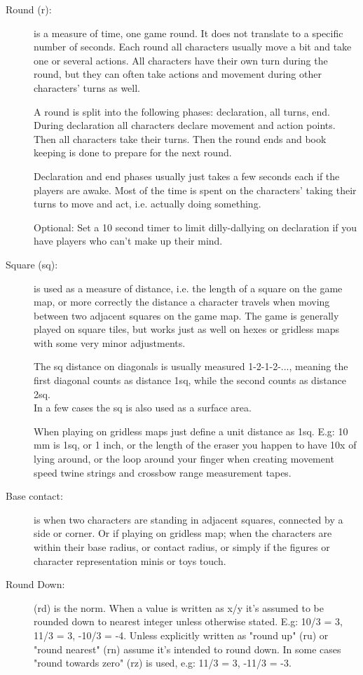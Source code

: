 \begin{description}
\item[Round (r):] is a measure of time, one game round. It does not translate to a specific number of seconds. Each round all characters usually move a bit and take one or several actions. All characters have their own turn during the round, but they can often take actions and movement during other characters' turns as well.

A round is split into the following phases: declaration, all turns, end.
During declaration all characters declare movement and action points. Then all characters take their turns. Then the round ends and book keeping is done to prepare for the next round.

Declaration and end phases usually just takes a few seconds each if the players are awake. Most of the time is spent on the characters' taking their turns to move and act, i.e. actually doing something.

Optional: Set a 10 second timer to limit dilly-dallying on declaration if you have players who can't make up their mind.


\item[Square (sq):] is used as a measure of distance, i.e. the length of a square on the game map, or more correctly the distance a character travels when moving between two adjacent squares on the game map. The game is generally played on square tiles, but works just as well on hexes or gridless maps with some very minor adjustments.

The sq distance on diagonals is usually measured 1-2-1-2-..., meaning the first diagonal counts as distance 1sq, while the second counts as distance 2sq.\\
In a few cases the sq is also used as a surface area.

When playing on gridless maps just define a unit distance as 1sq. E.g: 10 mm is 1sq, or 1 inch, or the length of the eraser you happen to have 10x of lying around, or the loop around your finger when creating movement speed twine strings and crossbow range measurement tapes.


\item[Base contact:] is when two characters are standing in adjacent squares, connected by a side or corner. Or if playing on gridless map; when the characters are within their base radius, or contact radius, or simply if the figures or character representation minis or toys touch.


\item[Round Down:] (rd) is the norm. When a value is written as x/y it's assumed to be rounded down to nearest integer unless otherwise stated. E.g: 10/3 = 3, 11/3 = 3, -10/3 = -4.
Unless explicitly written as "round up" (ru) or "round nearest" (rn) assume it's intended to round down. In some cases "round towards zero" (rz) is used, e.g: 11/3 = 3, -11/3 = -3.


\end{description}









